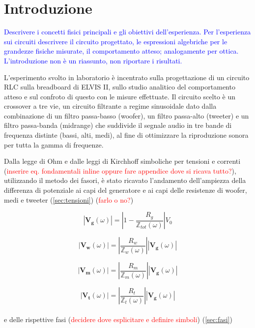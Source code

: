 \documentclass[12pt,italian]{article}
\newcommand{\prof}[1]{\textcolor{blue}{#1}}
\newcommand{\err}[1]{\textcolor{red}{#1}}
\begin{document}
\section*{Introduzione}
\prof{ Descrivere i concetti fisici principali e gli obiettivi dell'esperienza.
	Per l'esperienza sui circuiti descrivere il circuito progettato, le
	espressioni algebriche per le grandezze fisiche misurate, il comportamento
	atteso; analogamente per ottica. L'introduzione non è un riassunto, non
	riportare i risultati.}

L'esperimento svolto in laboratorio è incentrato sulla progettazione di un
circuito RLC sulla breadboard di ELVIS II, sullo studio analitico del
comportamento atteso e sul confroto di questo con le misure effettuate. Il
circuito scelto è un crossover a tre vie, un circuito filtrante a regime
sinusoidale dato dalla combinazione di un filtro passa-basso (woofer), un
filtro passa-alto (tweeter) e un filtro passa-banda (midrange) che suddivide il
segnale audio in tre bande di frequenza distinte (bassi, alti, medi), al fine
di ottimizzare la riproduzione sonora per tutta la gamma di frequenze.

Dalla legge di Ohm e dalle leggi di Kirchhoff simboliche per tensioni e
correnti (\err{inserire eq. fondamentali inline oppure fare appendice dove si
	ricava tutto?}), utilizzando il metodo dei fasori, è stato ricavato l'andamento
dell'ampiezza della differenza di potenziale ai capi del generatore e ai capi
delle resistenze di woofer, medi e tweeter (\ref{sec:tensioni}) (\err{farlo o
	no?})

\begin{equation}
	\left| \mathbf{V_{g}}(\omega) \right| = \left| 1 - \frac{R_g}
	{\mathbb{Z}_{tot}(\omega)}\right| V_{0}
	\label{eq:Vg}
\end{equation}

\begin{equation}
	\left| \mathbf{V_{w}}(\omega) \right| = \left| \frac{R_{w}}
	{\mathbb{Z}_{w}(\omega)}\right|\left| \mathbf{V_{g}}(\omega) \right|
	\label{eq:Vw}
\end{equation}

\begin{equation}
	\left| \mathbf{V_{m}}(\omega) \right| = \left| \frac{R_{m}}
	{\mathbb{Z}_{m}(\omega)}\right|\left| \mathbf{V_{g}}(\omega) \right|
	\label{eq:Vm}
\end{equation}

\begin{equation}
	\left| \mathbf{V_{t}}(\omega) \right| = \left| \frac{R_{t}}
	{\mathbb{Z}_{t}(\omega)}\right|\left| \mathbf{V_{g}}(\omega) \right|
	\label{eq:Vt}
\end{equation}
\\
e delle rispettive fasi (\err{decidere dove esplicitare e definire simboli}) (\ref{sec:fasi})
\end{document}
